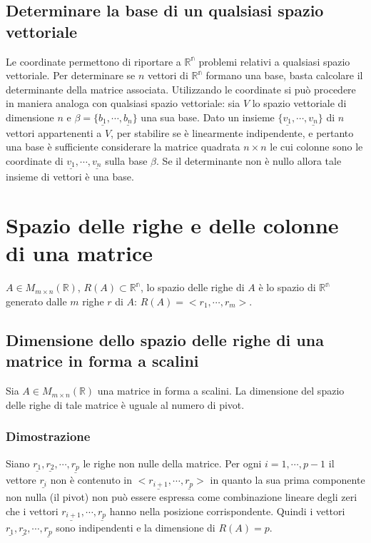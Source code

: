 \subsection{Determinare la base di un qualsiasi spazio vettoriale}
Le coordinate permettono di riportare a $\mathbb{R^n}$ problemi relativi a qualsiasi spazio vettoriale. Per determinare se $n$ vettori di $\mathbb{R^n}$ formano una base, basta
calcolare il determinante della matrice associata. Utilizzando le coordinate si pu\`o procedere in maniera analoga con qualsiasi spazio vettoriale: sia $V$ lo spazio vettoriale 
di dimensione $n$ e $\beta=\{\underline{b_1},\cdots,\underline{b_n}\}$ una sua base. Dato un insieme $\{\underline{v_1},\cdots,\underline{v_n}\}$ di $n$ vettori appartenenti a $V
$, per stabilire se \`e linearmente indipendente, e pertanto una base \`e sufficiente considerare la matrice quadrata $n\times n$ le cui colonne sono le coordinate di $
\underline{v_1},\cdots,\underline{v_n}$ sulla base $\beta$. Se il determinante non \`e nullo allora tale insieme di vettori \`e una base.
\section{Spazio delle righe e delle colonne di una matrice}
$A\in M_{m\times n}(\mathbb{R})$, $R(A)\subset\mathbb{R^n}$, lo spazio delle righe di $A$ \`e lo spazio di $\mathbb{R^n}$ generato dalle $m$ righe $r$ di $A$: $R(A)=<r_1,
\cdots,r_m>$.
\subsection{Dimensione dello spazio delle righe di una matrice in forma a scalini}
Sia $A\in M_{m\times n}(\mathbb{R})$ una matrice in forma a scalini. La dimensione del spazio delle righe di tale matrice \`e uguale al numero di pivot.
\subsubsection{Dimostrazione} 
Siano $\underline{r_1},\underline{r_2},\cdots,\underline{r_p}$ le righe non nulle della matrice. Per ogni $i=1,\cdots,p-1$ il vettore $\underline{r_i}$ non \`e contenuto in 
$<\underline{r_{i+1}},\cdots,\underline{r_p}>$ in quanto la sua prima componente non nulla (il pivot) non pu\`o essere espressa come combinazione lineare degli zeri che i vettori 
$\underline{r_{i+1}},\cdots,\underline{r_p}$ hanno nella posizione corrispondente. Quindi i vettori $\underline{r_1},\underline{r_2},\cdots,\underline{r_p}$ sono indipendenti e 
la dimensione di $R(A)=p$.

